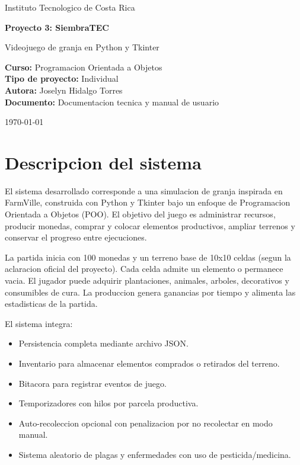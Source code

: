 \documentclass[12pt,a4paper]{article}
\begin{document}
\begin{titlepage}
    \centering
    {\Large Instituto Tecnologico de Costa Rica\par}
    \vspace{1.5cm}
    {\LARGE \textbf{Proyecto 3: SiembraTEC}\par}
    \vspace{0.4cm}
    {\large Videojuego de granja en Python y Tkinter\par}
    \vspace{2.0cm}

    \begin{flushleft}
        \textbf{Curso:} Programacion Orientada a Objetos\\
        \textbf{Tipo de proyecto:} Individual\\
        \textbf{Autora:} Joselyn Hidalgo Torres\\
        \textbf{Documento:} Documentacion tecnica y manual de usuario
    \end{flushleft}

    \vfill
    {\large \today\par}
\end{titlepage}

\tableofcontents
\newpage

\section{Descripcion del sistema}
El sistema desarrollado corresponde a una simulacion de granja inspirada en FarmVille, construida con Python y Tkinter bajo un enfoque de Programacion Orientada a Objetos (POO). El objetivo del juego es administrar recursos, producir monedas, comprar y colocar elementos productivos, ampliar terrenos y conservar el progreso entre ejecuciones.

La partida inicia con 100 monedas y un terreno base de 10x10 celdas (segun la aclaracion oficial del proyecto). Cada celda admite un elemento o permanece vacia. El jugador puede adquirir plantaciones, animales, arboles, decorativos y consumibles de cura. La produccion genera ganancias por tiempo y alimenta las estadisticas de la partida.

El sistema integra:
\begin{itemize}
    \item Persistencia completa mediante archivo JSON.
    \item Inventario para almacenar elementos comprados o retirados del terreno.
    \item Bitacora para registrar eventos de juego.
    \item Temporizadores con hilos por parcela productiva.
    \item Auto-recoleccion opcional con penalizacion por no recolectar en modo manual.
    \item Sistema aleatorio de plagas y enfermedades con uso de pesticida/medicina.
\end{itemize}
\end{document}
